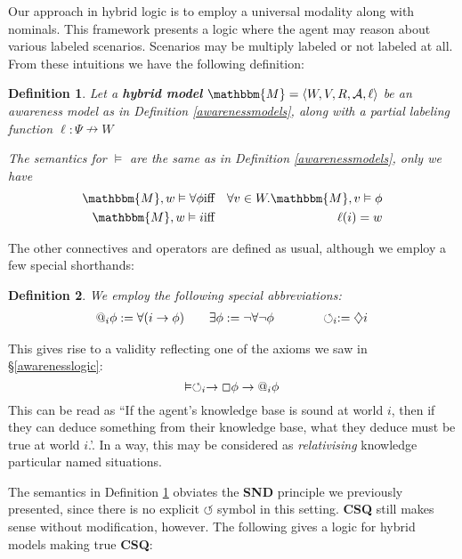\documentclass{article}
\newcommand{\assign}{:=}
\newcommand{\tmem}[1]{{\em #1\/}}
\newcommand{\tmtextbf}[1]{{\bfseries{#1}}}
\newcommand{\tmtextup}[1]{{\upshape{#1}}}
\newtheorem{definition}{Definition}
\begin{document}
Our approach in hybrid logic is to employ a universal modality along with
nominals.  This framework presents a logic where the agent may reason about
various labeled scenarios.  Scenarios may be multiply labeled or not labeled
at all.  From these intuitions we have the following definition:

\begin{definition}
  \label{hybridsemantics}Let a \tmtextbf{hybrid model} $\mathbbm{M}= \langle
  W, V, R, \mathcal{A}, \ell \rangle$ be an awareness model as in Definition
  \ref{awarenessmodels}, along with a partial labeling function $\ell : \Psi
  \nrightarrow W$
  
  
  
  The semantics for $\vDash$ are the same as in Definition
  \ref{awarenessmodels}, only we have
  \begin{eqnarray*}
    \mathbbm{M}, w \vDash \forall \phi & \text{iff} & \forall v \in
    W.\mathbbm{M}, v \vDash \phi\\
    \mathbbm{M}, w \vDash i & \text{iff} & \ell (i) = w
  \end{eqnarray*}
\end{definition}

The other connectives and operators are defined as usual, although we employ a
few special shorthands:

\begin{definition}
  We employ the following special abbreviations:
  \begin{eqnarray}
    \text{\tmtextup{@}}_i \phi \assign \forall (i \rightarrow \phi)
    \hspace{2em} & \exists \phi \assign \neg \forall \neg \phi \hspace{3em} &
    \circlearrowleft_i \assign \diamondsuit i \nonumber
  \end{eqnarray}
\end{definition}

This gives rise to a validity reflecting one of the axioms we saw in
{\S}\ref{awarenesslogic}:
\[ \vDash \circlearrowleft_i \rightarrow \Box \phi \rightarrow
   \text{\tmtextup{@}}_i \phi \]
This can be read as ``If the agent's knowledge base is sound at world $i$,
then if they can deduce something from their knowledge base, what they deduce
must be true at world $i$.'.  In a way, this may be considered as
{\tmem{relativising}} knowledge particular named situations.



The semantics in Definition \ref{hybridsemantics} obviates the \tmtextbf{SND}
principle we previously presented, since there is no explicit
$\circlearrowleft$ symbol in this setting. \tmtextbf{CSQ} still makes sense
without modification, however.  The following gives a logic for hybrid models
making true \tmtextbf{CSQ}:
\end{document}

